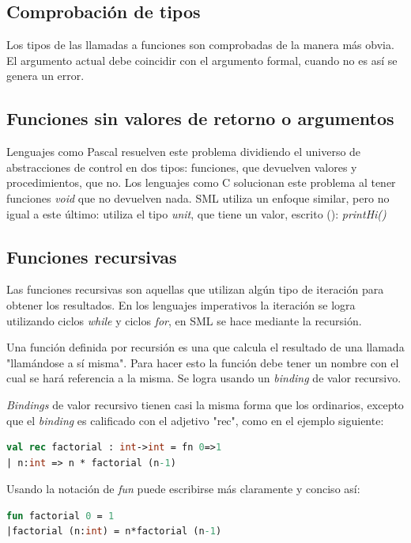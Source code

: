 \documentclass[10pt,journal,compsoc]{IEEEtran}
\begin{document}
\subsection{Comprobaci\'on de tipos}
Los tipos de las llamadas a funciones son comprobadas de la manera m\'as obvia. El argumento actual debe coincidir con el argumento formal, cuando no es as\'i se genera un error.

\subsection{Funciones sin valores de retorno o argumentos}
Lenguajes como Pascal resuelven este problema dividiendo el universo de abstracciones de control en dos tipos: funciones, que devuelven valores y procedimientos, que no. Los lenguajes como C solucionan este problema al tener funciones \textit{void} que no devuelven nada. SML utiliza un enfoque similar, pero no igual a este último: utiliza el tipo \textit{unit}, que tiene un valor, escrito (): \textit{printHi()}

\subsection{Funciones recursivas}
Las funciones recursivas son aquellas que utilizan alg\'un tipo de iteraci\'on para obtener los resultados. En los lenguajes imperativos la iteraci\'on se logra utilizando ciclos \textit{while} y ciclos \textit{for}, en SML se hace mediante la recursi\'on.

Una funci\'on definida por recursi\'on es una que calcula el resultado de una llamada "llam\'andose a s\'i misma". Para hacer esto la funci\'on debe tener un nombre con el cual se har\'a referencia a la misma. Se logra usando un \textit{binding} de valor recursivo.

\textit{Bindings} de valor recursivo tienen casi la misma forma que los ordinarios, excepto que el \textit{binding} es calificado con el adjetivo "rec", como en el ejemplo siguiente:

\begin{lstlisting}[language=ML, caption=Ejemplo Factorial Recursivo]
val rec factorial : int->int = fn 0=>1
| n:int => n * factorial (n-1)
\end{lstlisting}

Usando la notaci\'on de \textit{fun} puede escribirse m\'as claramente y conciso as\'i:

\begin{lstlisting}[language=ML, caption=Ejemplo Factorial Recursivo Fun]
fun factorial 0 = 1
|factorial (n:int) = n*factorial (n-1)
\end{lstlisting}
\end{document}
